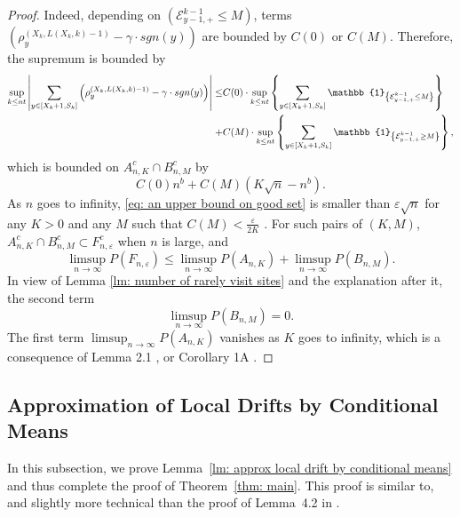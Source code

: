 \documentclass[twoside,12pt, a4paper]{article}
\numberwithin{equation}{section}
\theoremstyle{remark}
\newcommand{\abs}[1]{\left\vert #1 \right\vert}
\begin{document}
\begin{proof}
	Indeed, depending on $(\mathcal{E}^{k-1}_{y-1,+} \leq M)$, terms  $\left( \rho^{(X_k,L(X_k,k)-1)}_y -  \gamma \cdot sgn(y) \right)$ are bounded by $C(0)$ or $C(M)$. Therefore, the supremum is bounded by
	\begin{align*}
		\sup_{k\leq n t}  \abs{  	\sum_{y\in [X_{k}+1 ,S_k]} \left( \rho^{(X_k,L(X_k,k)-1)}_y -  \gamma \cdot sgn(y) \right) } \leq &  
		C(0) \cdot \sup_{k\leq n t} \left\{   	\sum_{y\in [X_{k}+1 ,S_k]} \mathbb{1}_{ \left\{ \mathcal{E}^{k-1}_{y-1,+} \leq M \right\} } \right\}
		\notag
		\\
		+& C(M) \cdot \sup_{k\leq n t} \left\{   	\sum_{y\in [X_{k}+1 ,S_k]} \mathbb{1}_{ \left\{ \mathcal{E}^{k-1}_{y-1,+} \geq M \right\} } \right\},
	\end{align*} which is bounded on $A^c_{n,K} \cap B^c_{n,M}$ by
	\begin{equation}\label{eq: an upper bound on good set}
		C(0)n^b  + C(M) \left(K \sqrt{n} -n^b\right).
	\end{equation} As $n$ goes to infinity, \eqref{eq: an upper bound on good set} is smaller than $\varepsilon \sqrt{n}$ for any $K>0$ and any $M$ such that $C(M) < \frac{\varepsilon}{2K}$ . 
	For such pairs of $(K,M)$, $A^c_{n,K} \cap B^c_{n,M} \subset F^c_{n,\varepsilon}$ when $n$ is large,  and 
	$$
	\limsup_{n\to \infty} P(F_{n,\varepsilon}) \leq \limsup_{n\to \infty}  P(A_{n,K}) +  \limsup_{n\to \infty}  P(B_{n,M}).
	$$ In view of Lemma \ref{lm: number of rarely visit sites} and the explanation after it, the second term $$\limsup_{n\to \infty}  P(B_{n,M})=0.$$  The first term $\limsup_{n\to \infty}  P(A_{n,K}) $ vanishes as $K$ goes to infinity, which is a consequence of Lemma 2.1 \cite{KMP23}, or Corollary 1A \cite{T96}.
\end{proof}


\subsection{Approximation of Local Drifts by Conditional Means}
\label{sec:DeltaRho}
In this subsection, we prove Lemma~\ref{lm: approx local drift by conditional means} and thus complete the proof of Theorem~\ref{thm: main}. This proof is similar to, and slightly more technical than the proof of {Lemma~4.2} in \cite{KP16}. 
\end{document}
